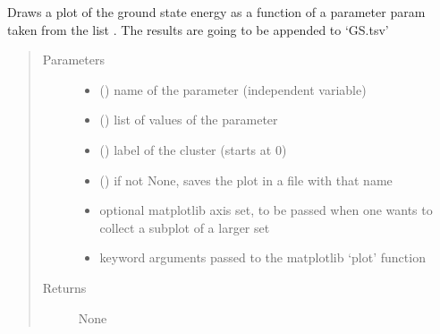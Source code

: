 \documentclass[letterpaper,10pt,english]{sphinxmanual}
\begin{document}
\begin{fulllineitems}
\label{\detokenize{vca:pyqcm.vca.plot_GS_energy}}
\sphinxAtStartPar
Draws a plot of the ground state energy as a function of a parameter param taken from the list . The results are going to be appended to ‘GS.tsv’
\begin{quote}\begin{description}
\item[{Parameters}] \leavevmode\begin{itemize}
\item {} 
\sphinxAtStartPar
{} () \textendash{} name of the parameter (independent variable)

\item {} 
\sphinxAtStartPar
{} (\sphinxstyleliteralemphasis{\sphinxupquote{{[}}}\sphinxstyleliteralemphasis{\sphinxupquote{{]}}}) \textendash{} list of values of the parameter

\item {} 
\sphinxAtStartPar
{} () \textendash{} label of the cluster (starts at 0)

\item {} 
\sphinxAtStartPar
{} () \textendash{} if not None, saves the plot in a file with that name

\item {} 
\sphinxAtStartPar
{} \textendash{} optional matplotlib axis set, to be passed when one wants to collect a subplot of a larger set

\item {} 
\sphinxAtStartPar
{} \textendash{} keyword arguments passed to the matplotlib ‘plot’ function

\end{itemize}

\item[{Returns}] \leavevmode
\sphinxAtStartPar
None

\end{description}\end{quote}

\end{fulllineitems}
\end{document}

